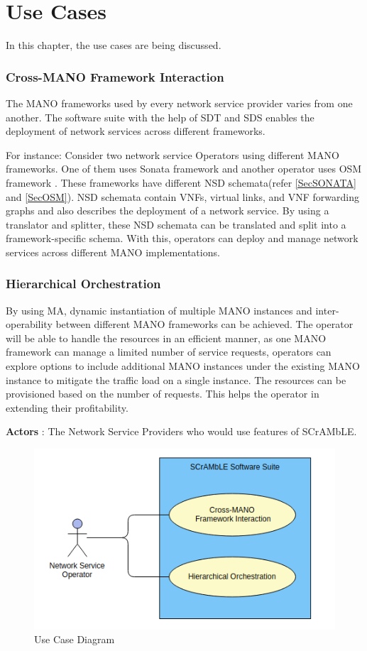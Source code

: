 \chapter{Use Cases}
\label{ch:Use Cases}

In this chapter, the use cases are being discussed.

\subsection{Cross-MANO Framework Interaction}
The MANO frameworks used by every network service provider varies from one another. The software suite with the help of SDT and SDS enables the deployment of network services across different frameworks.

For instance: Consider two network service Operators using different MANO frameworks. One of them uses Sonata framework \cite{draxler2017sonata} and another operator uses OSM framework \cite{ersue2013etsi}. These frameworks have different NSD schemata(refer \ref{SecSONATA} and \ref{SecOSM}). NSD schemata contain VNFs, virtual links, and VNF forwarding graphs and also describes the deployment of a network service. By using a translator and splitter, these NSD schemata can be translated and split into a framework-specific schema. With this, operators can deploy and manage network services across different MANO implementations.

\subsection{Hierarchical Orchestration}
By using MA, dynamic instantiation of multiple MANO instances and inter-operability between different MANO frameworks can be achieved. The operator will be able to handle the resources in an efficient manner, as one MANO framework can manage a limited number of service requests, operators can explore options to include additional MANO instances under the existing MANO instance to mitigate the traffic load on a single instance. The resources can be provisioned based on the number of requests. This helps the operator in extending their profitability.

\textbf{Actors} : The Network Service Providers who would use features of SCrAMbLE.

\begin{figure} [h]
	\centering
	\includegraphics[width=0.9\linewidth]{figures/use-case}
	\caption{Use Case Diagram}
	\label{fig:use-case}
\end{figure}





